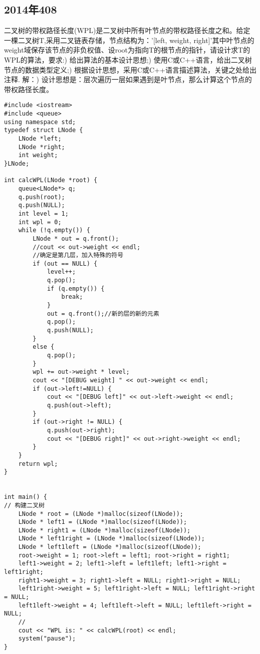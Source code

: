 \subsection{2014年408}
二叉树的带权路径长度(WPL)是二叉树中所有叶节点的带权路径长度之和。给定一棵二叉树T,采用二叉链表存储，节点结构为：'[left, weight, right]'其中叶节点的weight域保存该节点的非负权值、设root为指向T的根节点的指针，请设计求T的WPL的算法，要求:) 给出算法的基本设计思想;) 使用C或C++语言，给出二叉树节点的数据类型定义;) 根据设计思想，采用C或C++语言描述算法，关键之处给出注释.\newline
解：)\newline
设计思想是：层次遍历一层如果遇到是叶节点，那么计算这个节点的带权路径长度。\newline
\begin{lstlisting}[basicstyle=\small\ttfamily, caption={}, numbers=none]
#include <iostream>
#include <queue>
using namespace std;
typedef struct LNode {
	LNode *left;
	LNode *right;
	int weight;
}LNode;

int calcWPL(LNode *root) {
	queue<LNode*> q;
	q.push(root);
	q.push(NULL);
	int level = 1;
	int wpl = 0;
	while (!q.empty()) {
		LNode * out = q.front();
		//cout << out->weight << endl;
		//确定是第几层，加入特殊的符号
		if (out == NULL) {
			level++;
			q.pop();
			if (q.empty()) {
				break;
			}
			out = q.front();//新的层的新的元素
			q.pop();
			q.push(NULL);
		}
		else {
			q.pop();
		}
		wpl += out->weight * level;
		cout << "[DEBUG weight] " << out->weight << endl;
		if (out->left!=NULL) {
			cout << "[DEBUG left]" << out->left->weight << endl;
			q.push(out->left);
		}
		if (out->right != NULL) {
			q.push(out->right);
			cout << "[DEBUG right]" << out->right->weight << endl;
		}
	}
	return wpl;
}


int main() {
// 构建二叉树
	LNode * root = (LNode *)malloc(sizeof(LNode));
	LNode * left1 = (LNode *)malloc(sizeof(LNode));
	LNode * right1 = (LNode *)malloc(sizeof(LNode));
	LNode * left1right = (LNode *)malloc(sizeof(LNode));
	LNode * left1left = (LNode *)malloc(sizeof(LNode));
	root->weight = 1; root->left = left1; root->right = right1;
	left1->weight = 2; left1->left = left1left; left1->right = left1right;
	right1->weight = 3; right1->left = NULL; right1->right = NULL;
	left1right->weight = 5; left1right->left = NULL; left1right->right = NULL;
	left1left->weight = 4; left1left->left = NULL; left1left->right = NULL;
	//
	cout << "WPL is: " << calcWPL(root) << endl;
	system("pause");
}
\end{lstlisting}
